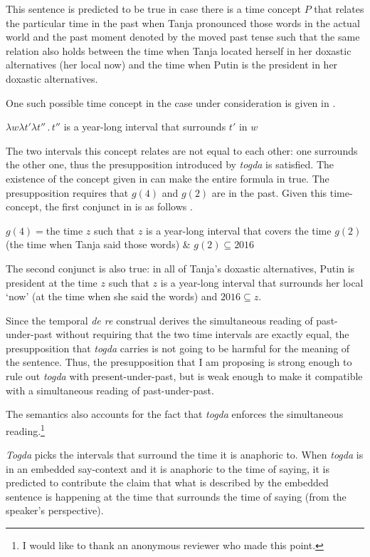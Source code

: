 \documentclass[output=paper,
modfonts,
newtxmath,
hidelinks
]{langscibook}
\begin{document}
\noindent This sentence is predicted to be true in case there is a time concept $P$ that relates the particular time in the past when Tanja pronounced those words in the actual world and the past moment denoted by the moved past tense such that the same relation also holds between the time when Tanja located herself in her doxastic alternatives (her local now) and the time when Putin is the president in her doxastic alternatives.

One such possible time concept in the case under consideration is given in .

\ea $\lambda w\lambda t'\lambda t''\,.\,t''$ is a year-long interval that surrounds $t'$ in $w$\label{20:ex41}
\z

\noindent The two intervals this concept relates are not equal to each other: one surrounds the other one, thus the presupposition introduced by \textit{togda} is satisfied. The existence of the concept given in  can make the entire formula in  true. The presupposition requires that $g(4)$ and $g(2)$ are in the past. Given this time-concept, the first conjunct in  is as follows .

\ea $g(4)={}$the time $z$ such that $z$ is a year-long interval that covers
\glt \hspace{0.5cm}the time $g(2)$ (the time when Tanja said those words) \& $g(2)\subseteq 2016$\label{20:ex42}
\z

\noindent The second conjunct is also true: in all of Tanja’s doxastic alternatives, Putin is president at the time $z$ such that $z$ is a year-long interval that surrounds her local `now' (at the time when she said the words) and $2016\subseteq z$.

Since the temporal \textit{de re} construal derives the simultaneous reading of past-under-past without requiring that the two time intervals are exactly equal, the presupposition that \textit{togda} carries is not going to be harmful for the meaning of the sentence. Thus, the presupposition that I am proposing is strong enough to rule out \textit{togda} with present-under-past, but is weak enough to make it compatible with a simultaneous reading of past-under-past.

The semantics  also accounts for the fact that \textit{togda} enforces the simultaneous reading.\footnote{\label{20:fn12}I would like to thank an anonymous reviewer who made this point.}

\textit{Togda} picks the intervals that surround the time it is anaphoric to. When \textit{togda} is in an embedded say-context and it is anaphoric to the time of saying, it is predicted to contribute the claim that what is described by the embedded sentence is happening at the time that surrounds the time of saying (from the speaker’s perspective).
\end{document}

